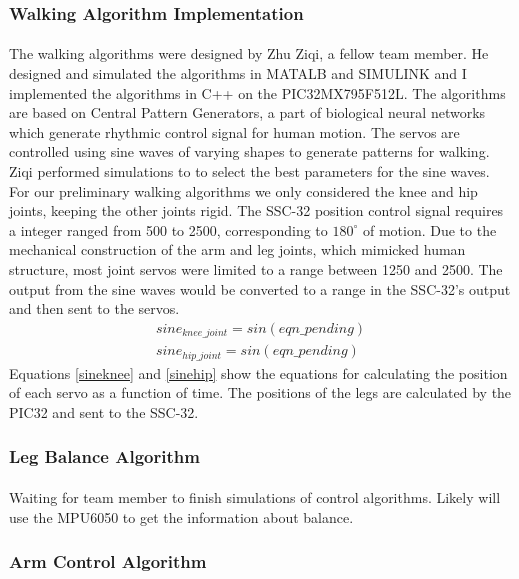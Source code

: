 \documentclass{article}
\begin{document}
\subsubsection{Walking Algorithm Implementation} 
\paragraph{} The walking algorithms were designed by Zhu Ziqi, a fellow team
member. He designed and simulated the algorithms in MATALB and SIMULINK and I
implemented the algorithms in C++ on the PIC32MX795F512L. The algorithms are
based on Central Pattern Generators, a part of biological neural networks which
generate rhythmic control signal for human motion\cite{cpggeneral}. The servos
are controlled using sine waves of varying shapes to generate patterns for
walking. Ziqi performed simulations to to select the best parameters for the
sine waves. For our preliminary walking algorithms we only considered the knee
and hip joints, keeping the other joints rigid. The SSC-32 position control
signal requires a integer ranged from 500 to 2500, corresponding to
$180^{\circ}$ of motion\cite{sscdata}. Due to the mechanical construction of the
arm and leg joints, which mimicked human structure, most joint servos were
limited to a range between 1250 and 2500. The output from the sine waves would
be converted to a range in the SSC-32's output and then sent to the servos. 
\begin{align}
    sine_{knee\_joint}=sin(eqn\_pending) \label{sineknee}\\
    sine_{hip\_joint}=sin(eqn\_pending) \label{sinehip}
\end{align}
Equations \ref{sineknee} and \ref{sinehip} show the equations for calculating
the position of each servo as a function of time. The positions of the legs are
calculated by the PIC32 and sent to the SSC-32.

\subsubsection{Leg Balance Algorithm}
\paragraph{} Waiting for team member to finish simulations of control
algorithms. Likely will use the MPU6050 to get the information about balance.

\subsubsection{Arm Control Algorithm}
\end{document}
